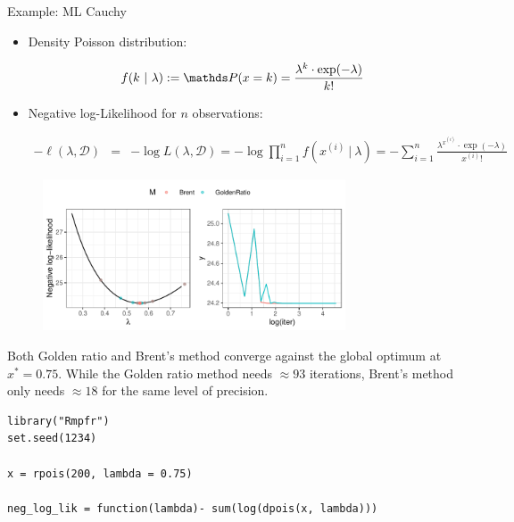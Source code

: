 \documentclass[11pt,compress,t,notes=noshow, xcolor=table]{beamer}
\begin{document}
\begin{vbframe}{Example: ML Cauchy}


\begin{itemize}
\item Density Poisson distribution:
\begin{footnotesize}
$$
f(k ~|~ \lambda) := \P(x = k) = \frac{\lambda^k \cdot \exp(-\lambda)}{k!}
$$
\end{footnotesize}
\item Negative log-Likelihood for $n$ observations:
\begin{footnotesize}
\begin{eqnarray*}
- \ell(\lambda, \mathcal{D}) &=& - \log L(\lambda, \mathcal{D}) = - \log \prod_{i = 1}^n  f\left(x^{(i)} ~|~ \lambda\right) =  - \sum_{i = 1}^n \frac{\lambda^{x^{(i)} } \cdot \exp(-\lambda)}{x^{(i)} !} 
\end{eqnarray*}
\end{footnotesize}

\end{itemize}

\vspace*{-0.5cm}
\begin{figure}
  \includegraphics[width = 0.8\textwidth]{figure_man/poisson.pdf}
\end{figure}




\framebreak 

Both Golden ratio and Brent's method converge against the global optimum at $x^\ast = 0.75$. While the Golden ratio method needs $\approx 93$ iterations, Brent's method only needs $\approx 18$ for the same level of precision. 

\lz
\footnotesize
\begin{verbatim}
library("Rmpfr")
set.seed(1234)

x = rpois(200, lambda = 0.75)

neg_log_lik = function(lambda)- sum(log(dpois(x, lambda)))


\end{verbatim}
\end{vbframe}
\end{document}

